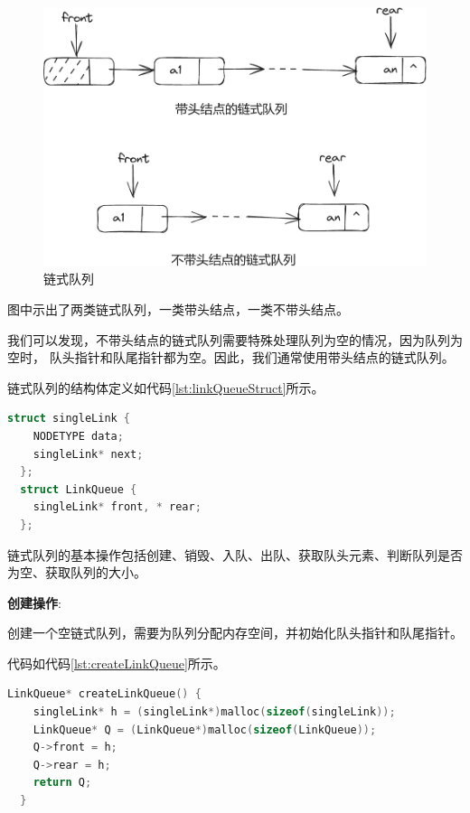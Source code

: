 \documentclass[lang=cn,newtx,10pt,scheme=chinese]{../elegantbook}
\begin{document}
\begin{figure}[h]
  \centering
  \includegraphics[width=1\textwidth]{./figure/pdf/cropped/linkQueue.pdf}
  \caption{链式队列}
  \label{fig:linkQueue}
\end{figure}

图中示出了两类链式队列，一类带头结点，一类不带头结点。

我们可以发现，不带头结点的链式队列需要特殊处理队列为空的情况，因为队列为空时，
队头指针和队尾指针都为空。因此，我们通常使用带头结点的链式队列。

链式队列的结构体定义如代码\ref{lst:linkQueueStruct}所示。

\begin{lstlisting}[language=C++, caption={链式队列结构体定义}, label={lst:linkQueueStruct}]
  struct singleLink {
	NODETYPE data;
	singleLink* next;
  }; 
  struct LinkQueue {
    singleLink* front, * rear;
  };
\end{lstlisting}

链式队列的基本操作包括创建、销毁、入队、出队、获取队头元素、判断队列是否为空、获取队列的大小。

\textbf{创建操作}:

创建一个空链式队列，需要为队列分配内存空间，并初始化队头指针和队尾指针。

代码如代码\ref{lst:createLinkQueue}所示。

\begin{lstlisting}[language=C++, caption={创建一个空链式队列示例代码}, label={lst:createLinkQueue}]
  LinkQueue* createLinkQueue() {
    singleLink* h = (singleLink*)malloc(sizeof(singleLink));
    LinkQueue* Q = (LinkQueue*)malloc(sizeof(LinkQueue));
    Q->front = h;
    Q->rear = h;
    return Q;
  }
  \end{lstlisting}
\end{document}

